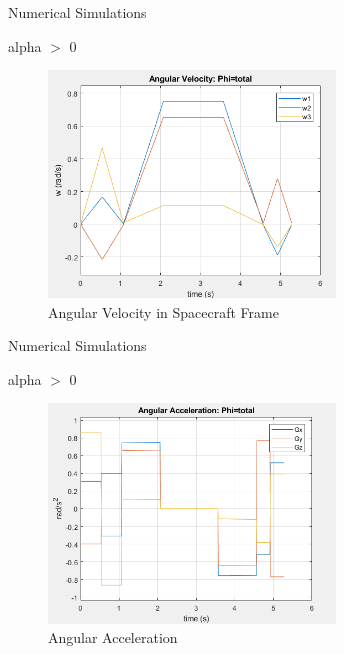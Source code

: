 \documentclass{beamer}
\begin{document}
\begin{frame}{Numerical Simulations}
	\begin{block}{alpha $>$ 0}
		
		
		\begin{figure}[H]
			\label{fig:ang_vel_phi_total}
			\begin{center}
				\includegraphics[width=3in]{figures/alphaNot0/ang_vel_phi_total.png}
			\end{center}
			\caption{Angular Velocity in Spacecraft Frame}
		\end{figure}
	\end{block}
\end{frame}
\begin{frame}{Numerical Simulations}
	\begin{block}{alpha $>$ 0}
		
		
		\begin{figure}[H]
			\label{fig:ang_accel_total}
			\begin{center}
				\includegraphics[width=3in]{figures/alphaNot0/ang_accel_total.png}
			\end{center}
			\caption{Angular Acceleration}
		\end{figure}
		
	\end{block}
\end{frame}
\end{document}
